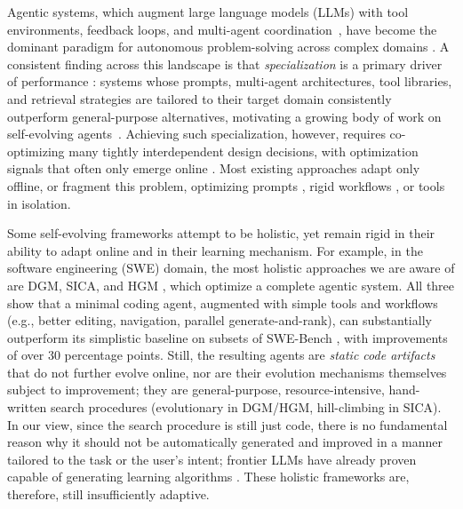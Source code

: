Agentic systems, which augment large language models (LLMs) with tool environments, feedback loops, and multi-agent coordination~\cite{react2023,sweagent2024,openhands2024,autogen2024,metagpt2024}, have become the dominant paradigm for autonomous problem-solving across complex domains \cite{agentsurvey2024, anthropic2025claudecode,github2025copilot,anthropic2026agentteams,github2025copilotsubagents,moonshot2026agentswarm}. A consistent finding across this landscape is that \emph{specialization} is a primary driver of performance \cite{dgm2025,robeyns2025selfimproving,agentsurvey2024}: systems whose prompts, multi-agent architectures, tool libraries, and retrieval strategies are tailored to their target domain consistently outperform general-purpose alternatives, motivating a growing body of work on self-evolving agents~\cite{gao2025selfevolvingsurvey}. Achieving such specialization, however, requires co-optimizing many tightly interdependent design decisions, with optimization signals that often only emerge online \cite{livesweagent2025,wang2025mas2}. Most existing approaches adapt only offline, or fragment this problem, optimizing prompts \cite{dspy2024,evoprompt2024}, rigid workflows \cite{aflow2025,adas2025,wang2025mas2}, or tools \cite{latm2024,craft2024,livesweagent2025} in isolation.

Some self-evolving frameworks attempt to be holistic, yet remain rigid in their ability to adapt online and in their learning mechanism. For example, in the software engineering (SWE) domain, the most holistic approaches we are aware of are DGM, SICA, and HGM \cite{dgm2025,robeyns2025selfimproving,wang2025huxley}, which optimize a complete agentic system. All three show that a minimal coding agent, augmented with simple tools and workflows (e.g., better editing, navigation, parallel generate-and-rank), can substantially outperform its simplistic baseline on subsets of SWE-Bench \cite{swebench2024}, with improvements of over 30 percentage points. Still, the resulting agents are \textit{static code artifacts} that do not further evolve online, nor are their evolution mechanisms themselves subject to improvement; they are general-purpose, resource-intensive, hand-written search procedures (evolutionary in DGM/HGM, hill-climbing in SICA). In our view, since the search procedure is still just code, there is no fundamental reason why it should not be automatically generated and improved in a manner tailored to the task or the user's intent; frontier LLMs have already proven capable of generating learning algorithms \cite{alphaevolve2025,romeraparedes2024funsearch}. These holistic frameworks are, therefore, still insufficiently adaptive.

